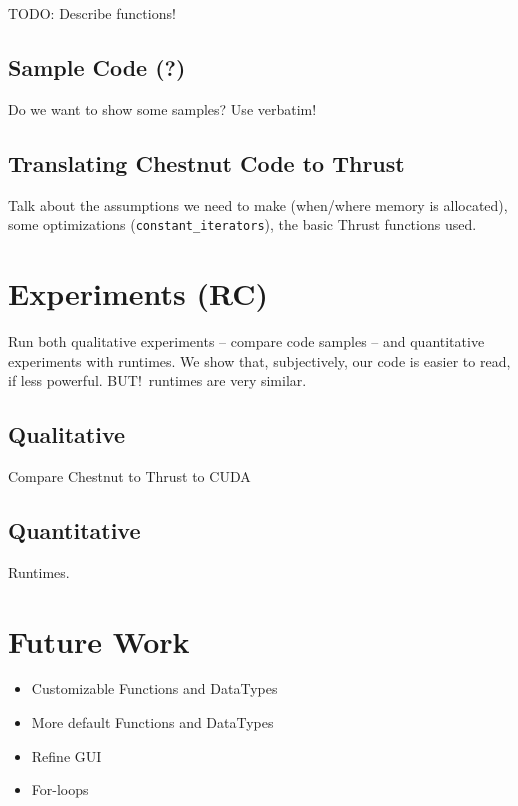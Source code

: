 \documentclass{article}
\renewcommand{\|}{\origbar} %
\newcommand{\code}[1]{\texttt{#1}}
\begin{document}
TODO: Describe functions!

\subsection{Sample Code (?)}

Do we want to show some samples? Use verbatim!

\subsection{Translating Chestnut Code to Thrust}

Talk about the assumptions we need to make (when/where memory is allocated), some optimizations (\code{constant\_iterators}), the basic Thrust functions used.

\section{Experiments (RC)}

Run both qualitative experiments -- compare code samples -- and quantitative experiments with runtimes. We show that, subjectively, our code is easier to read, if less powerful. BUT!\ runtimes are very similar.

\subsection{Qualitative}

Compare Chestnut to Thrust to CUDA

\subsection{Quantitative}

Runtimes.

\section{Future Work}
\label{sec:future}

\begin{itemize}
  \item Customizable Functions and DataTypes
  \item More default Functions and DataTypes
  \item Refine GUI
  \item For-loops
\end{itemize}
\end{document}
